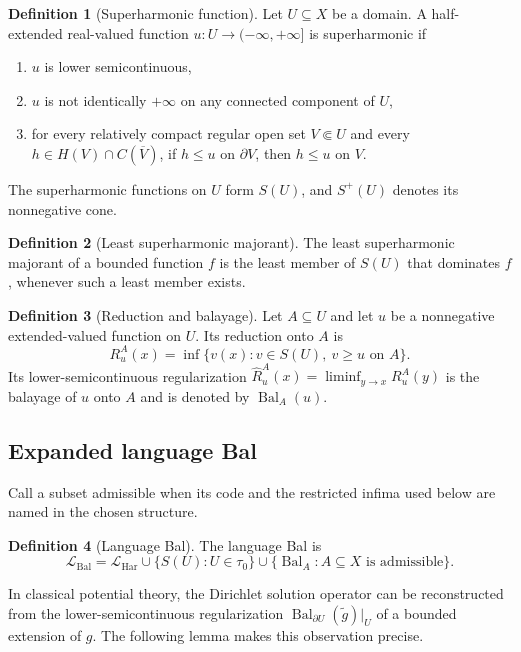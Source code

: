 \documentclass{amsart}
\theoremstyle{definition}
\newtheorem{definition}{Definition}[section]
\theoremstyle{remark}
\numberwithin{equation}{section}
\begin{document}
\begin{definition}[Superharmonic function] Let $U\subseteq X$ be a domain. A half-extended real-valued function $u:U\to(-\infty,+\infty]$ is superharmonic if
	\begin{enumerate}
		\item $u$ is lower semicontinuous,
		\item $u$ is not identically $+\infty$ on any connected component of $U$,
		\item for every relatively compact regular open set $V\Subset U$ and every $h\in H(V)\cap C(\overline V)$, if $h\le u$ on $\partial V$,
		then
		$h\le u$ on $V$.
	\end{enumerate}
	
	The superharmonic functions on $U$ form $S(U)$, and $S^+(U)$ denotes its nonnegative cone.
\end{definition}


\begin{definition}[Least superharmonic majorant]
	The least superharmonic majorant of a bounded function $f$ is the least member of $S(U)$ that dominates $f$, whenever such a least member exists.
\end{definition}

\begin{definition}[Reduction and balayage]
	Let $A\subseteq U$ and let $u$ be a nonnegative extended-valued function on $U$. Its reduction onto $A$ is
	$$
	R_u^A(x)
	=
	\inf\{v(x):v\in S(U),\ v\ge u\text{ on }A\}.
	$$
	Its lower-semicontinuous regularization $\widehat R_u^A(x)=\liminf_{y\to x}R_u^A(y)$ is the balayage of $u$ onto $A$ and is denoted by $\operatorname{Bal}_A(u)$.
\end{definition}




\subsection{Expanded language Bal} 
Call a subset admissible when its code and the restricted infima used below are named in the chosen structure.

\begin{definition}[Language Bal] The language Bal is
	$$\mathcal L_{\mathrm{Bal}}=\mathcal L_{\mathrm{Har}}\cup\{S(U):U\in\tau_0\}\cup\{\operatorname{Bal}_A:A\subseteq X\text{ is admissible}\}.$$
\end{definition}


In classical potential theory, %
the Dirichlet solution operator can be reconstructed from the lower-semicontinuous regularization $\operatorname{Bal}_{\partial U}(\tilde g)|_U$ of a bounded extension of $g$. The following lemma makes this observation precise.
\end{document}
